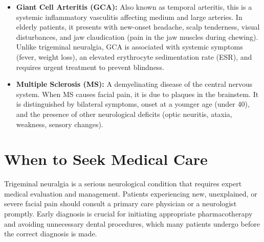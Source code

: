 \begin{itemize}
  \item \textbf{Giant Cell Arteritis (GCA):} Also known as temporal arteritis, this is a systemic inflammatory vasculitis affecting medium and large arteries. In elderly patients, it presents with new-onset headache, scalp tenderness, visual disturbances, and jaw claudication (pain in the jaw muscles during chewing). Unlike trigeminal neuralgia, GCA is associated with systemic symptoms (fever, weight loss), an elevated erythrocyte sedimentation rate (ESR), and requires urgent treatment to prevent blindness.
  \item \textbf{Multiple Sclerosis (MS):} A demyelinating disease of the central nervous system. When MS causes facial pain, it is due to plaques in the brainstem. It is distinguished by bilateral symptoms, onset at a younger age (under 40), and the presence of other neurological deficits (optic neuritis, ataxia, weakness, sensory changes).
\end{itemize}

\section*{When to Seek Medical Care}
Trigeminal neuralgia is a serious neurological condition that requires expert medical evaluation and management. Patients experiencing new, unexplained, or severe facial pain should consult a primary care physician or a neurologist promptly. Early diagnosis is crucial for initiating appropriate pharmacotherapy and avoiding unnecessary dental procedures, which many patients undergo before the correct diagnosis is made.

